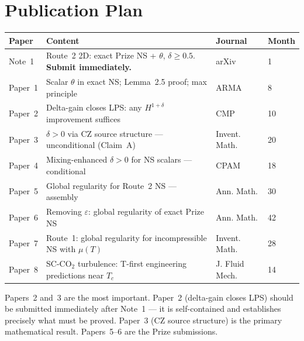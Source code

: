 \documentclass[11pt, a4paper]{article}
\theoremstyle{definition}
\theoremstyle{remark}
\newcommand{\eps}{\varepsilon}
\newcommand{\thet}{\theta}
\newcommand{\delt}{\delta}
\begin{document}
\section{Publication Plan}

\begin{center}
\begin{tabular}{lp{7cm}ll}
\toprule
\textbf{Paper} & \textbf{Content} & \textbf{Journal} & \textbf{Month} \\
\midrule
Note~1 & Route~2 2D: exact Prize NS + $\thet$, $\delt\geq 0.5$. \textbf{Submit immediately.} & arXiv & 1 \\
Paper~1 & Scalar $\thet$ in exact NS; Lemma~2.5 proof; max principle & ARMA & 8 \\
Paper~2 & Delta-gain closes LPS: any $H^{1+\delt}$ improvement suffices & CMP & 10 \\
Paper~3 & $\delt > 0$ via CZ source structure --- unconditional (Claim~A) & Invent. Math. & 20 \\
Paper~4 & Mixing-enhanced $\delt > 0$ for NS scalars --- conditional & CPAM & 18 \\
Paper~5 & Global regularity for Route~2 NS --- assembly & Ann. Math. & 30 \\
Paper~6 & Removing $\eps$: global regularity of exact Prize NS & Ann. Math. & 42 \\
Paper~7 & Route~1: global regularity for incompressible NS with $\mu(T)$ & Invent. Math. & 28 \\
Paper~8 & SC-CO$_2$ turbulence: T-first engineering predictions near $T_c$ & J. Fluid Mech. & 14 \\
\bottomrule
\end{tabular}
\end{center}

Papers~2 and~3 are the most important. Paper~2 (delta-gain closes LPS) should be submitted
immediately after Note~1 --- it is self-contained and establishes precisely what must be proved.
Paper~3 (CZ source structure) is the primary mathematical result.
Papers~5--6 are the Prize submissions.
\end{document}
